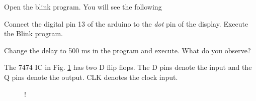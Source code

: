 %
Open the blink program.  You will see the following
%

\begin{problem}
	Connect the digital pin 13 of the arduino to the {\em dot} pin of the display. Execute the Blink program.
\end{problem}
\begin{problem}
Change the delay to 500 ms in the program and execute.  What do you observe?
\end{problem}
%	
The 7474 IC in Fig. \ref{fig:7474} has two D flip flops.  The D pins denote the input and the Q pins denote the output. CLK denotes the clock input.
%
\begin{figure}[!h]
\begin{center}
\resizebox {\columnwidth} {!} {

}
\end{center}
\caption{}
\label{fig:7474}
\end{figure}
%


